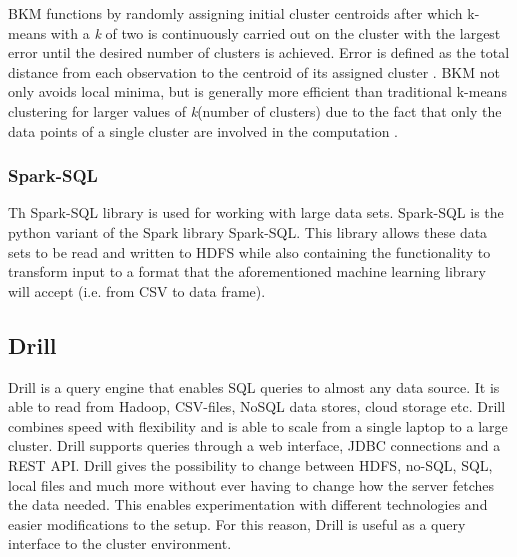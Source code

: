 \documentclass[main.tex]{subfiles}
\begin{document}
BKM functions by randomly assigning initial cluster centroids after which k-means with a \textit{k} of two is continuously carried out on the cluster with the largest error until the desired number of clusters is achieved. Error is defined as the total distance from each observation to the centroid of its assigned cluster \cite{bkmGeneral}. BKM not only avoids local minima, but is generally more efficient than traditional k-means clustering for larger values of \textit{k}(number of clusters) due to the fact that only the data points of a single cluster are involved in the computation  \cite{bkmGood}.\\

\subsubsection{Spark-SQL}
Th Spark-SQL library \cite{pysparkSQL} is used for working with large data sets. Spark-SQL is the python variant of the Spark library Spark-SQL. This library allows these data sets to be read and written to HDFS while also containing the functionality to transform input to a format that the aforementioned machine learning library will accept (i.e. from CSV to data frame). 

\subsection{Drill}
Drill is a query engine that enables SQL queries to almost any data source. It is able to read from Hadoop, CSV-files, NoSQL data stores, cloud storage etc.  Drill combines speed with flexibility and is able to scale from a single laptop to a large cluster. Drill supports queries through a web interface, JDBC connections and a REST API. Drill gives the possibility to change between HDFS, no-SQL, SQL, local files and much more without ever having to change how the server fetches the data needed. This enables experimentation with different technologies and easier modifications to the setup. For this reason, Drill is useful as a query interface to the cluster environment. 
\end{document}
